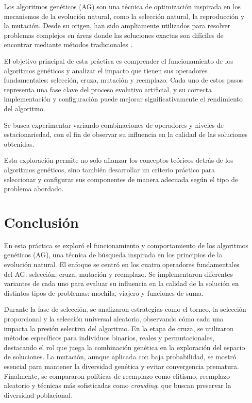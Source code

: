 \documentclass[12pt,twoside]{report}
\begin{document}
	Los algoritmos genéticos (AG) son una técnica de optimización inspirada en los mecanismos de la evolución natural, como la selección natural, la reproducción y la mutación. Desde su origen, han sido ampliamente utilizados para resolver problemas complejos en áreas donde las soluciones exactas son difíciles de encontrar mediante métodos tradicionales \cite{gas}.
	
	El objetivo principal de esta práctica es comprender el funcionamiento de los algoritmos genéticos y analizar el impacto que tienen sus operadores fundamentales: selección, cruza, mutación y reemplazo. Cada uno de estos pasos representa una fase clave del proceso evolutivo artificial, y su correcta implementación y configuración puede mejorar significativamente el rendimiento del algoritmo.
	
	Se busca experimentar variando combinaciones de operadores y niveles de estacionariedad, con el fin de observar su influencia en la calidad de las soluciones obtenidas.
	
	Esta exploración permite no solo afianzar los conceptos teóricos detrás de los algoritmos genéticos, sino también desarrollar un criterio práctico para seleccionar y configurar sus componentes de manera adecuada según el tipo de problema abordado.
	
	
	
	
	
	
	
	
	
	
	\chapter*{Conclusión}
	
	En esta práctica se exploró el funcionamiento y comportamiento de los algoritmos genéticos (AG), una técnica de búsqueda inspirada en los principios de la evolución natural. El enfoque se centró en los cuatro operadores fundamentales del AG: selección, cruza, mutación y reemplazo. Se implementaron diferentes variantes de cada uno para evaluar su influencia en la calidad de la solución en distintos tipos de problemas: mochila, viajero y funciones de suma.
	
	Durante la fase de selección, se analizaron estrategias como el torneo, la selección proporcional y la selección universal aleatoria, observando cómo cada una impacta la presión selectiva del algoritmo. En la etapa de cruza, se utilizaron métodos específicos para individuos binarios, reales y permutacionales, destacando el rol que juega la combinación genética en la exploración del espacio de soluciones. La mutación, aunque aplicada con baja probabilidad, se mostró esencial para mantener la diversidad genética y evitar convergencia prematura. Finalmente, se compararon políticas de reemplazo como elitismo, reemplazo aleatorio y técnicas más sofisticadas como \textit{crowding}, que buscan preservar la diversidad poblacional.
	
\end{document}
